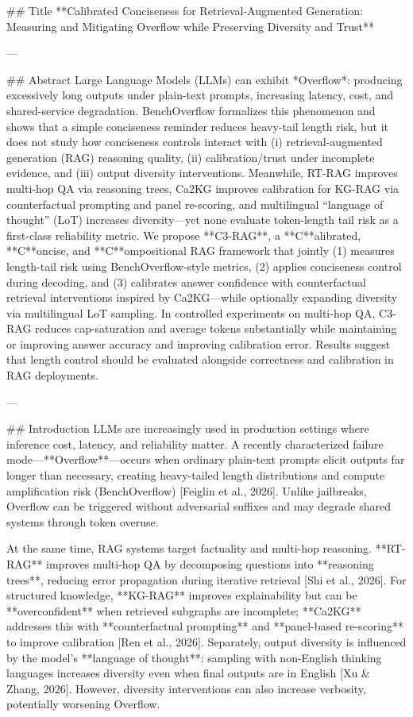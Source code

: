 ## Title  
**Calibrated Conciseness for Retrieval-Augmented Generation: Measuring and Mitigating Overflow while Preserving Diversity and Trust**

---

## Abstract  
Large Language Models (LLMs) can exhibit *Overflow*: producing excessively long outputs under plain-text prompts, increasing latency, cost, and shared-service degradation. BenchOverflow formalizes this phenomenon and shows that a simple conciseness reminder reduces heavy-tail length risk, but it does not study how conciseness controls interact with (i) retrieval-augmented generation (RAG) reasoning quality, (ii) calibration/trust under incomplete evidence, and (iii) output diversity interventions. Meanwhile, RT-RAG improves multi-hop QA via reasoning trees, Ca2KG improves calibration for KG-RAG via counterfactual prompting and panel re-scoring, and multilingual “language of thought” (LoT) increases diversity—yet none evaluate token-length tail risk as a first-class reliability metric.  
We propose **C3-RAG**, a **C**alibrated, **C**oncise, and **C**ompositional RAG framework that jointly (1) measures length-tail risk using BenchOverflow-style metrics, (2) applies conciseness control during decoding, and (3) calibrates answer confidence with counterfactual retrieval interventions inspired by Ca2KG—while optionally expanding diversity via multilingual LoT sampling. In controlled experiments on multi-hop QA, C3-RAG reduces cap-saturation and average tokens substantially while maintaining or improving answer accuracy and improving calibration error. Results suggest that length control should be evaluated alongside correctness and calibration in RAG deployments.

---

## Introduction  
LLMs are increasingly used in production settings where inference cost, latency, and reliability matter. A recently characterized failure mode—**Overflow**—occurs when ordinary plain-text prompts elicit outputs far longer than necessary, creating heavy-tailed length distributions and compute amplification risk (BenchOverflow) [Feiglin et al., 2026]. Unlike jailbreaks, Overflow can be triggered without adversarial suffixes and may degrade shared systems through token overuse.

At the same time, RAG systems target factuality and multi-hop reasoning. **RT-RAG** improves multi-hop QA by decomposing questions into **reasoning trees**, reducing error propagation during iterative retrieval [Shi et al., 2026]. For structured knowledge, **KG-RAG** improves explainability but can be **overconfident** when retrieved subgraphs are incomplete; **Ca2KG** addresses this with **counterfactual prompting** and **panel-based re-scoring** to improve calibration [Ren et al., 2026]. Separately, output diversity is influenced by the model’s **language of thought**: sampling with non-English thinking languages increases diversity even when final outputs are in English [Xu & Zhang, 2026]. However, diversity interventions can also increase verbosity, potentially worsening Overflow.

